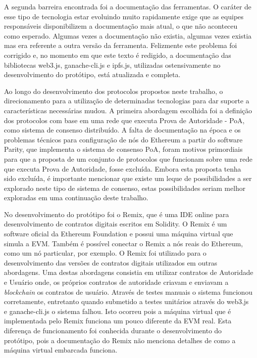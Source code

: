 \documentclass[tcc,capa]{texufpel}
\begin{document}
        A segunda barreira encontrada foi a documentação das ferramentas. O caráter de esse tipo de tecnologia estar evoluindo muito rapidamente exige que as equipes responsáveis disponibilizem a documentação mais atual, o que não aconteceu como esperado. Algumas vezes a documentação não existia, algumas vezes existia mas era referente a outra versão da ferramenta. Felizmente este problema foi corrigido e, no momento em que este texto é redigido, a documentação das bibliotecas web3.js, ganache-cli.js e ipfs.js, utilizadas ostensivamente no desenvolvimento do protótipo, está atualizada e completa.
    
        Ao longo do desenvolvimento dos protocolos propostos neste trabalho, o direcionamento para a utilização de determinadas tecnologias para dar suporte a características necessárias mudou. A primeira abordagem escolhida foi a definição dos protocolos com base em uma rede que executa Prova de Autoridade - PoA, como sistema de consenso distribuído. A falta de documentação na época e os problemas técnicos para configuração de nós do Ethereum a partir do software Parity, que implementa o sistema de consenso PoA, foram motivos primordiais para que a proposta de um conjunto de protocolos que funcionam sobre uma rede que executa Prova de Autoridade, fosse excluída. Embora esta proposta tenha sido excluída, é importante mencionar que existe um leque de possibilidades a ser explorado neste tipo de sistema de consenso, estas possibilidades seriam melhor exploradas em uma continuação deste trabalho.
    
        No desenvolvimento do protótipo foi o Remix, que é uma IDE online para desenvolvimento de contratos digitais escritos em Solidity. O Remix é um software oficial da Ethereum Foundation e possui uma máquina virtual que simula a EVM. Também é possível conectar o Remix a nós reais do Ethereum, como um nó particular, por exemplo. O Remix foi utilizado para o desenvolvimento das versões de contratos digitais utilizados em outras abordagens. Uma destas abordagens consistia em utilizar contratos de Autoridade e Usuário onde, os próprios contratos de autoridade criavam e enviavam a \textit{blockchain} os contratos de usuário. Através de testes manuais o sistema funcionou corretamente, entretanto quando submetido a testes unitários através do web3.js e ganache-cli.js o sistema falhou. Isto ocorreu pois a máquina virtual que é implementada pelo Remix funciona um pouco diferente da EVM real. Esta diferença de funcionamento foi conhecida durante o desenvolvimento do protótipo, pois a documentação do Remix não menciona detalhes de como a máquina virtual embarcada funciona.
    
\end{document}
